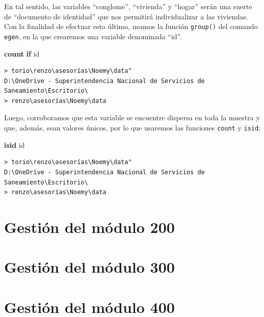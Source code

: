 \documentclass[
]{book}
\newenvironment{Shaded}{\begin{snugshade}}{\end{snugshade}}
\newcommand{\FunctionTok}[1]{\textcolor[rgb]{0.13,0.29,0.53}{\textbf{#1}}}
\newcommand{\KeywordTok}[1]{\textcolor[rgb]{0.13,0.29,0.53}{\textbf{#1}}}
\newcommand{\NormalTok}[1]{#1}
\theoremstyle{definition}
\theoremstyle{definition}
\theoremstyle{definition}
\theoremstyle{definition}
\theoremstyle{remark}
\begin{document}
En tal sentido, las variables ``conglome'', ``vivienda'' y ``hogar'' serán una suerte de ``documento de identidad'' que nos permitirá individualizar a las viviendas. Con la finalidad de efectuar esto último, usamos la función \texttt{group()} del comando \texttt{egen}, en la que crearemos una variable denominada ``id''.

\begin{Shaded}
\begin{Highlighting}[]
\FunctionTok{count} \KeywordTok{if}\NormalTok{ id}
\end{Highlighting}
\end{Shaded}

\begin{verbatim}
> torio\renzo\asesorías\Noemy\data"
D:\OneDrive - Superintendencia Nacional de Servicios de Saneamiento\Escritorio\
> renzo\asesorías\Noemy\data
\end{verbatim}

Luego, corroboramos que esta variable se encuentre dispersa en toda la muestra y que, además, sean valores únicos, por lo que usaremos las funciones \texttt{count} y \texttt{isid}:

\begin{Shaded}
\begin{Highlighting}[]
\KeywordTok{isid}\NormalTok{ id}
\end{Highlighting}
\end{Shaded}

\begin{verbatim}
> torio\renzo\asesorías\Noemy\data"
D:\OneDrive - Superintendencia Nacional de Servicios de Saneamiento\Escritorio\
> renzo\asesorías\Noemy\data
\end{verbatim}

\hypertarget{gestiuxf3n-del-muxf3dulo-200}{%
\section{Gestión del módulo 200}\label{gestiuxf3n-del-muxf3dulo-200}}

\hypertarget{gestiuxf3n-del-muxf3dulo-300}{%
\section{Gestión del módulo 300}\label{gestiuxf3n-del-muxf3dulo-300}}

\hypertarget{gestiuxf3n-del-muxf3dulo-400}{%
\section{Gestión del módulo 400}\label{gestiuxf3n-del-muxf3dulo-400}}
\end{document}
